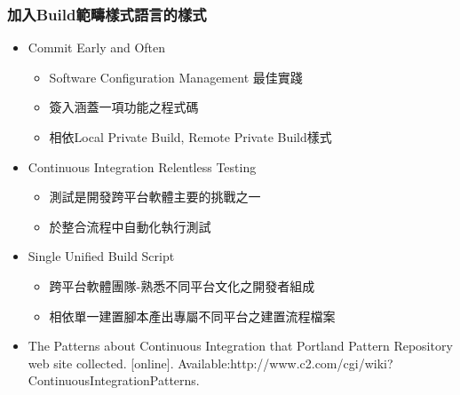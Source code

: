 \documentclass[utf8x]{beamer}
\begin{document}
\begin{frame}
\frametitle{加入Build範疇樣式語言的樣式\dag}
\begin{itemize}
\setlength{\itemindent}{1em}
\item[] Commit Early and Often
\begin{itemize}
\item Software Configuration Management 最佳實踐
\item 簽入涵蓋一項功能之程式碼
\item 相依Local Private Build, Remote Private Build樣式
\end{itemize}
\item[] Continuous Integration Relentless Testing
\begin{itemize}
\item 測試是開發跨平台軟體主要的挑戰之一
\item 於整合流程中自動化執行測試
\end{itemize}
\item[] Single Unified Build Script
\begin{itemize}
\item 跨平台軟體團隊-熟悉不同平台文化之開發者組成
\item 相依單一建置腳本產出專屬不同平台之建置流程檔案
\end{itemize}
\fontsize{8pt}{8pt}\selectfont
\item[\dag]The Patterns about Continuous Integration that Portland Pattern Repository web site collected. [online]. Available:http://www.c2.com/cgi/wiki? ContinuousIntegrationPatterns.
\end{itemize}
\end{frame}

\end{document}
